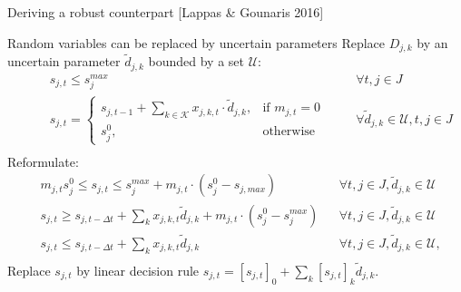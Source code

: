 \documentclass[slides]{beamer}
\begin{document}
\begin{frame}{Deriving a robust counterpart [Lappas \& Gounaris 2016]}
\begin{block}{Random variables can be replaced by uncertain parameters}
    Replace $D_{j,k}$ by an uncertain parameter $\tilde{d}_{j,k}$ bounded by a set $\mathcal{U}$:
    \vspace{-10pt}
    \begin{equation*}
    \begin{aligned}
    &
    && s_{j,t} \leq s_{j}^{max}
    &&& \forall t, j \in J\\
    &
    && s_{j,t} =
    \begin{cases}
    s_{j,t-1} + \sum_{k \in \mathcal{K}}{x_{j,k,t}\cdot \tilde{d}_{j,k}}, & \text{if } m_{j,t} = 0\\
    s_{j}^{0}, & \text{otherwise}
    \end{cases}
    &&& \forall \tilde{d}_{j,k} \in \mathcal{U}, t, j \in J\\
    \end{aligned}
    \end{equation*}
    \vspace{-5pt}
    Reformulate:
    \vspace{-5pt}
    \begin{equation*}
    \begin{aligned}
    & m_{j,t} s_{j}^{0} \leq s_{j,t} \leq s_{j}^{max} + m_{j,t} \cdot (s_{j}^{0} - s_{j,max})
    && \forall t, j \in J, \tilde{d}_{j,k} \in \mathcal{U}\\
    & s_{j,t} \geq s_{j,t-\Delta t} + \sum_{k}{x_{j,k,t}\tilde{d}_{j,k}} + m_{j,t} \cdot (s_{j}^{0} - s_{j}^{max})
    && \forall t, j \in J, \tilde{d}_{j,k} \in \mathcal{U}\\
    & s_{j,t} \leq s_{j,t-\Delta t} + \sum_{k}{x_{j,k,t}\tilde{d}_{j,k}}
    && \forall t, j \in J, \tilde{d}_{j,k} \in \mathcal{U},\\
    \end{aligned}
    \end{equation*}
Replace $s_{j,t}$ by linear decision rule $s_{j,t} = [s_{j,t}]_{0} + \sum_{k}{[s_{j,t}]_{k}\tilde{d}_{j,k}}$.
\end{block}
\end{frame}
\end{document}
